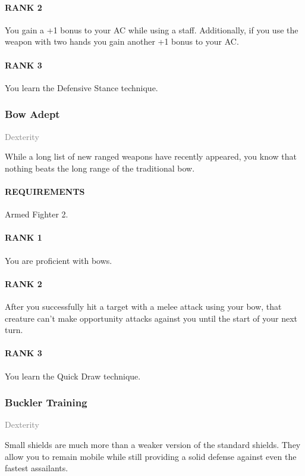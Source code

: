 \paragraph{RANK 2} You gain a +1 bonus to your AC while using a staff.
Additionally, if you use the weapon with two hands you gain another +1 bonus to your AC.
\paragraph{RANK 3} You learn the Defensive Stance technique.

\subsubsection{Bow Adept} \label{tal::bowadept}
\small{\textcolor{gray}{Dexterity}}

\normalsize
While a long list of new ranged weapons have recently appeared, you know that nothing beats the long range of the traditional bow.
\paragraph{REQUIREMENTS} Armed Fighter 2.
\paragraph{RANK 1} You are proficient with bows.
\paragraph{RANK 2} After you successfully hit a target with a melee attack using your bow, that creature can't make opportunity attacks against you until the start of your next turn.
\paragraph{RANK 3} You learn the Quick Draw technique.

\subsubsection{Buckler Training} \label{tal::bucklertraining}
\small{\textcolor{gray}{Dexterity}}

\normalsize
Small shields are much more than a weaker version of the standard shields.
They allow you to remain mobile while still providing a solid defense against even the fastest assailants.
